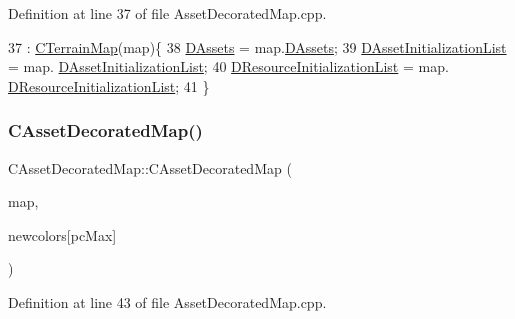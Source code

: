 Definition at line 37 of file Asset\+Decorated\+Map.\+cpp.


\begin{DoxyCode}
37                                                                     : 
      \hyperlink{classCTerrainMap_a2ac9c0f2622d06b8e0b1f5d67199f1ea}{CTerrainMap}(map)\{
38     \hyperlink{classCAssetDecoratedMap_a94eeed5b16141169b1ba6cb3842055aa}{DAssets} = map.\hyperlink{classCAssetDecoratedMap_a94eeed5b16141169b1ba6cb3842055aa}{DAssets};
39     \hyperlink{classCAssetDecoratedMap_a2b7bf2e9a19a9173093cef32048608c2}{DAssetInitializationList} = map.
      \hyperlink{classCAssetDecoratedMap_a2b7bf2e9a19a9173093cef32048608c2}{DAssetInitializationList};
40     \hyperlink{classCAssetDecoratedMap_ab4c78aeb90280ea98a3aa542cdb7f8cc}{DResourceInitializationList} = map.
      \hyperlink{classCAssetDecoratedMap_ab4c78aeb90280ea98a3aa542cdb7f8cc}{DResourceInitializationList};
41 \}
\end{DoxyCode}
\hypertarget{classCAssetDecoratedMap_ac22988ad1953fe43ae477dc5abc73db3}{}\label{classCAssetDecoratedMap_ac22988ad1953fe43ae477dc5abc73db3} 
\subsubsection{\texorpdfstring{C\+Asset\+Decorated\+Map()}{CAssetDecoratedMap()}\hspace{0.1cm}{\footnotesize\ttfamily [3/3]}}
{\footnotesize\ttfamily C\+Asset\+Decorated\+Map\+::\+C\+Asset\+Decorated\+Map (\begin{DoxyParamCaption}\item[{const \hyperlink{classCAssetDecoratedMap}{C\+Asset\+Decorated\+Map} \&}]{map,  }\item[{\hyperlink{GameDataTypes_8h_aafb0ca75933357ff28a6d7efbdd7602f}{E\+Player\+Color}}]{newcolors\mbox{[}pc\+Max\mbox{]} }\end{DoxyParamCaption})}



Definition at line 43 of file Asset\+Decorated\+Map.\+cpp.


